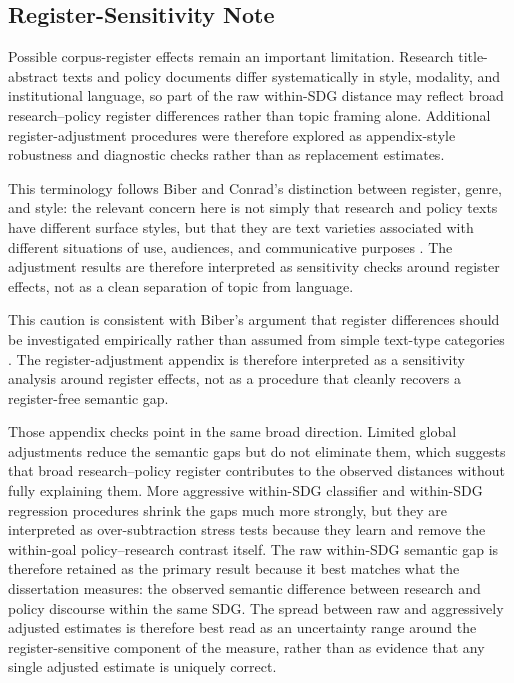 \documentclass[12pt,a4paper]{article}
\begin{document}
\subsection{Register-Sensitivity Note}

Possible corpus-register effects remain an important limitation. Research title-abstract texts and policy documents differ systematically in style, modality, and institutional language, so part of the raw within-SDG distance may reflect broad research--policy register differences rather than topic framing alone. Additional register-adjustment procedures were therefore explored as appendix-style robustness and diagnostic checks rather than as replacement estimates.

This terminology follows Biber and Conrad's distinction between register, genre, and style: the relevant concern here is not simply that research and policy texts have different surface styles, but that they are text varieties associated with different situations of use, audiences, and communicative purposes \parencite{biberConrad2009register}. The adjustment results are therefore interpreted as sensitivity checks around register effects, not as a clean separation of topic from language.

This caution is consistent with Biber's argument that register differences should be investigated empirically rather than assumed from simple text-type categories \parencite{biber1988variation}. The register-adjustment appendix is therefore interpreted as a sensitivity analysis around register effects, not as a procedure that cleanly recovers a register-free semantic gap.

Those appendix checks point in the same broad direction. Limited global adjustments reduce the semantic gaps but do not eliminate them, which suggests that broad research--policy register contributes to the observed distances without fully explaining them. More aggressive within-SDG classifier and within-SDG regression procedures shrink the gaps much more strongly, but they are interpreted as over-subtraction stress tests because they learn and remove the within-goal policy--research contrast itself. The raw within-SDG semantic gap is therefore retained as the primary result because it best matches what the dissertation measures: the observed semantic difference between research and policy discourse within the same SDG. The spread between raw and aggressively adjusted estimates is therefore best read as an uncertainty range around the register-sensitive component of the measure, rather than as evidence that any single adjusted estimate is uniquely correct.
\end{document}
